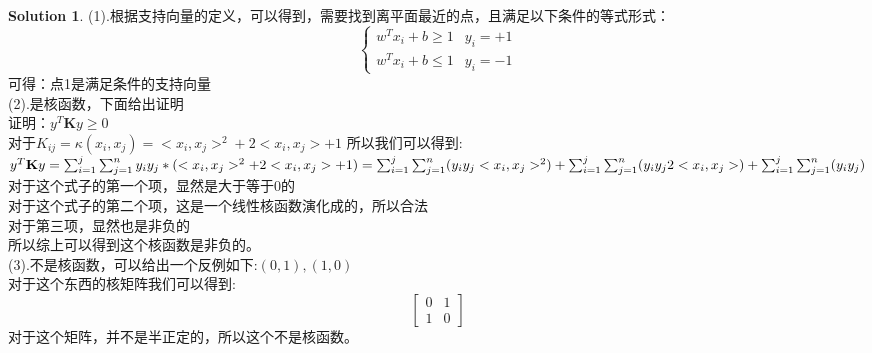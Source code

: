 \documentclass[a4paper,UTF8]{article}
\numberwithin{equation}{section}
\theoremstyle{definition}
\newtheorem*{solution}{Solution}
\begin{document}
\begin{solution}
(1).根据支持向量的定义，可以得到，需要找到离平面最近的点，且满足以下条件的等式形式：
\begin{equation*}
    \begin{cases}
        w^T x_i + b \geq 1 & y_i = + 1\\
        w^T x_i + b \leq 1 & y_i = -1
    \end{cases}
\end{equation*}
可得：点1是满足条件的支持向量\\
(2).是核函数，下面给出证明\\
证明：$y^T \mathbf{K} y \geq 0$\\
对于$K_{ij} = \kappa(x_i,x_j) = <x_i,x_j>^2 + 2<x_i,x_j> + 1 $
所以我们可以得到:\\
$y^T \mathbf{K} y = \sum_{i=1}^{j} \sum_{j=1}^{n} y_i y_j *(<x_i,x_j>^2 + 2<x_i,x_j> + 1)\\
= \sum_{i=1}^{j} \sum_{j=1}^{n}( y_i y_j <x_i,x_j>^2) + \sum_{i=1}^{j} \sum_{j=1}^{n}( y_i y_j 2<x_i,x_j>) + \sum_{i=1}^{j} \sum_{j=1}^{n}( y_i y_j ) $
对于这个式子的第一个项，显然是大于等于0的\\
对于这个式子的第二个项，这是一个线性核函数演化成的，所以合法\\
对于第三项，显然也是非负的\\
所以综上可以得到这个核函数是非负的。\\

(3).不是核函数，可以给出一个反例如下:$(0,1),(1,0)$\\
对于这个东西的核矩阵我们可以得到:\\
\[\begin{bmatrix}
    0 & 1\\
    1 & 0
\end{bmatrix}\]
对于这个矩阵，并不是半正定的，所以这个不是核函数。


\end{solution}
\end{document}
